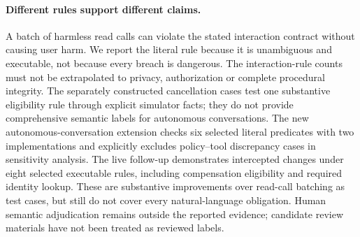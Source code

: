 \documentclass[10pt]{article}
\begin{document}
\paragraph{Different rules support different claims.}
A batch of harmless read calls can violate the stated interaction contract without causing user harm. We report the literal rule because it is unambiguous and executable, not because every breach is dangerous. The interaction-rule counts must not be extrapolated to privacy, authorization or complete procedural integrity. The separately constructed cancellation cases test one substantive eligibility rule through explicit simulator facts; they do not provide comprehensive semantic labels for autonomous conversations. The new autonomous-conversation extension checks six selected literal predicates with two implementations and explicitly excludes policy--tool discrepancy cases in sensitivity analysis. The live follow-up demonstrates intercepted changes under eight selected executable rules, including compensation eligibility and required identity lookup. These are substantive improvements over read-call batching as test cases, but still do not cover every natural-language obligation. Human semantic adjudication remains outside the reported evidence; candidate review materials have not been treated as reviewed labels.
\end{document}
